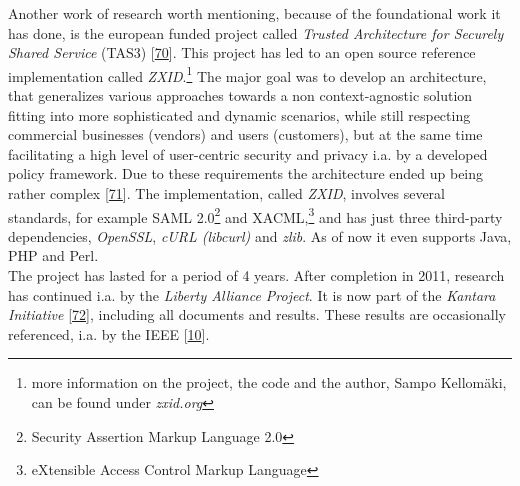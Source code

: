 \documentclass[12pt,english,a4paper,titlepage,cleardoublepage=empty,dottedtoc]{report}
\begin{document}
Another work of research worth mentioning, because of the foundational
work it has done, is the european funded project called \emph{Trusted
Architecture for Securely Shared Service} (TAS3)
{[}\protect\hyperlink{ref-web_2011_tas3-project}{70}{]}. This project
has led to an open source reference implementation called
\emph{ZXID}.\footnote{more information on the project, the code and the
  author, Sampo Kellomäki, can be found under \emph{zxid.org}} The major
goal was to develop an architecture, that generalizes various approaches
towards a non context-agnostic solution fitting into more sophisticated
and dynamic scenarios, while still respecting commercial businesses
(vendors) and users (customers), but at the same time facilitating a
high level of user-centric security and privacy i.a. by a developed
policy framework. Due to these requirements the architecture ended up
being rather complex
{[}\protect\hyperlink{ref-graphic_2011_architecture_components-of-organization-domain}{71}{]}.
The implementation, called \emph{ZXID}, involves several standards, for
example SAML 2.0\footnote{Security Assertion Markup Language 2.0} and
XACML,\footnote{eXtensible Access Control Markup Language} and has just
three third-party dependencies, \emph{OpenSSL}, \emph{cURL (libcurl)}
and \emph{zlib}. As of now it even supports Java, PHP and Perl.\\
The project has lasted for a period of 4 years. After completion in
2011, research has continued i.a. by the \emph{Liberty Alliance
Project}. It is now part of the \emph{Kantara Initiative}
{[}\protect\hyperlink{ref-web_kantara-initiative}{72}{]}, including all
documents and results. These results are occasionally referenced, i.a.
by the IEEE
{[}\protect\hyperlink{ref-paper_2013_the-personal-data-store-approach-to-personal-data-security_2013}{10}{]}.
\end{document}
